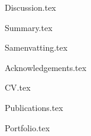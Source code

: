 \documentclass[10pt,twoside,openright]{memoir}
\begin{document}
{Discussion.tex}
\clearemptydoublepage

\backmatter
\thumbfalse
{Summary.tex}
\clearemptydoublepage

{Samenvatting.tex}
\clearemptydoublepage

{Acknowledgements.tex}
\clearemptydoublepage

{CV.tex}
\clearemptydoublepage

{Publications.tex}
\clearemptydoublepage

{Portfolio.tex}
\clearemptydoublepage

\printglossary[type=main]
\printglossary[type=\acronymtype]
\clearemptydoublepage

\newrefcontext[sorting=none]
\printbibliography[heading=bibintoc]
\end{document}
